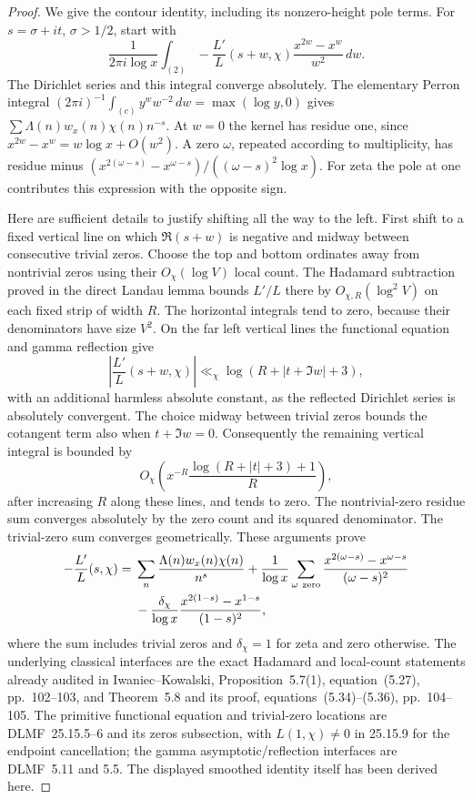\begin{proof}
We give the contour identity, including its nonzero-height
pole terms. For \(s=\sigma+it\), \(\sigma>1/2\), start with
\[
 \frac1{2\pi i\log x}\int_{(2)}
       -\frac{L'}L(s+w,\chi)
             \frac{x^{2w}-x^w}{w^2}\,dw.
\]
The Dirichlet series and this integral converge absolutely.
The elementary Perron integral
\((2\pi i)^{-1}\int_{(c)}y^w w^{-2}\,dw=\max(\log y,0)\)
gives \(\sum\Lambda(n)w_x(n)\chi(n)n^{-s}\).
At \(w=0\) the kernel has residue one, since
\(x^{2w}-x^w=w\log x+O(w^2)\).
A zero \(\omega\), repeated according to multiplicity,
has residue minus
\((x^{2(\omega-s)}-x^{\omega-s})/((\omega-s)^2\log x)\).
For zeta the pole at one contributes this expression with
the opposite sign.

Here are sufficient details to justify shifting all the way
to the left. First shift to a fixed vertical line on which
\(\Re(s+w)\) is negative and midway between consecutive
trivial zeros. Choose the top and bottom ordinates away
from nontrivial zeros using their \(O_\chi(\log V)\) local
count. The Hadamard subtraction proved in the direct
Landau lemma bounds \(L'/L\) there by
\(O_{\chi,R}(\log^2 V)\) on each fixed strip of width \(R\).
The horizontal integrals tend to zero, because their
denominators have size \(V^2\). On the far left vertical
lines the functional equation and gamma reflection give
\[
 \left|\frac{L'}L(s+w,\chi)\right|
       \ll_\chi \log(R+|t+\Im w|+3),
\]
with an additional harmless absolute constant, as the
reflected Dirichlet series is absolutely convergent.
The choice midway between trivial zeros bounds the
cotangent term also when \(t+\Im w=0\).
Consequently the remaining vertical integral is bounded by
\[
 O_\chi\left(x^{-R}
                \frac{\log(R+|t|+3)+1}{R}\right),
\]
after increasing \(R\) along these lines, and tends to zero.
The nontrivial-zero residue sum converges absolutely by
the zero count and its squared denominator. The trivial-zero
sum converges geometrically. These arguments prove
\begin{align}
 -\frac{L'}L(s,\chi)
 ={}&\sum_n\frac{\Lambda(n)w_x(n)\chi(n)}{n^s}
 +\frac1{\log x}\sum_{\omega\ {\rm zero}}
          \frac{x^{2(\omega-s)}-x^{\omega-s}}{(\omega-s)^2}
 \nonumber\\
 &-\frac{\delta_\chi}{\log x}
          \frac{x^{2(1-s)}-x^{1-s}}{(1-s)^2},
 \label{eq:A049-smoothed-logderivative}
\end{align}
where the sum includes trivial zeros and
\(\delta_\chi=1\) for zeta and zero otherwise.
The underlying classical interfaces are the exact
Hadamard and local-count statements already audited in
Iwaniec--Kowalski, Proposition~5.7(1), equation~(5.27),
pp.~102--103, and Theorem~5.8 and its proof,
equations~(5.34)--(5.36), pp.~104--105.
The primitive functional equation and trivial-zero locations
are DLMF~25.15.5--6 and its zeros subsection, with
\(L(1,\chi)\ne0\) in 25.15.9 for the endpoint cancellation; the gamma
asymptotic/reflection interfaces are DLMF~5.11 and 5.5.
The displayed smoothed identity itself has been derived here.


\end{proof}
